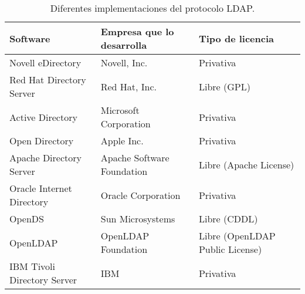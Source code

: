 \begin{table}[H]
	\centering
	\begin{tabular}{ |p{4cm}|p{4cm}|p{4cm}| }
		\hline
		\textbf{Software}&\textbf{Empresa que lo desarrolla}&\textbf{Tipo de licencia}\\
		\hline
		Novell eDirectory  &  Novell, Inc.  & Privativa\\
		\hline
		Red Hat Directory Server& Red Hat, Inc.&Libre (GPL)\\
		\hline
		Active Directory &Microsoft Corporation& Privativa\\
		\hline
		Open Directory&Apple Inc.& Privativa\\
		\hline
		Apache Directory Server&   Apache Software Foundation& Libre (Apache License)\\
		\hline
		Oracle Internet Directory&Oracle Corporation& Privativa\\
		\hline
		OpenDS&Sun Microsystems& Libre (CDDL)\\
		\hline
		OpenLDAP&OpenLDAP Foundation& Libre (OpenLDAP Public License)\\
		\hline
		IBM Tivoli Directory Server&IBM& Privativa\\
		\hline
	\end{tabular}
	\caption{\label{tab:table-name}Diferentes implementaciones del protocolo LDAP.}
\end{table}